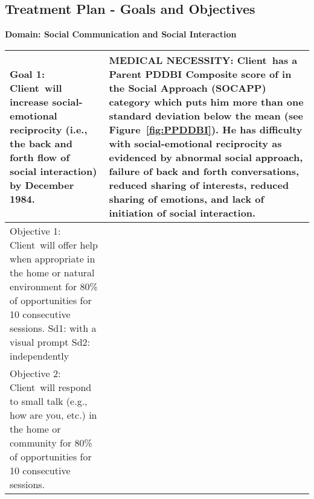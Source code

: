 \documentclass{article}
\def\clientfirstname{Client}
\def\ending{December 1984}
\begin{document}
\begin{landscape}
\section{Treatment Plan - Goals and Objectives}

\textbf{Domain: Social Communication and Social Interaction}\\
	
	\begin{tabular}{|p{11cm}|p{11cm}|}
	\hline
	\textbf{Goal 1:  \clientfirstname\ will increase social-emotional reciprocity (i.e., the back and forth flow of social interaction) by \ending.} & \textbf{MEDICAL NECESSITY:  \clientfirstname\ has a Parent PDDBI Composite score of \getcell{9}{T score} {\parent} in the Social Approach (SOCAPP) category which puts him more than one standard deviation below the mean (see Figure~\ref{fig:PPDDBI}).  He has difficulty with social-emotional reciprocity as evidenced by abnormal social approach, failure of back and forth conversations, reduced sharing of interests, reduced sharing of emotions, and lack of initiation of social interaction.} \\ 
	\hline
	Objective 1: \clientfirstname\ will offer help \underline{\hspace{0.5cm}}when appropriate in the home or natural environment for 80\% of opportunities for 10 consecutive sessions.\newline\newline
	Sd1: with a visual prompt\newline
	Sd2: independently\newline
	& \raisebox{-6.0cm}{\texttt{[image: Help.png]}}\\
	\hline
	
	Objective 2: \clientfirstname\ will respond to small talk (e.g., how are you, etc.) in the home or community for 80\% of opportunities for 10 consecutive sessions. 
	& \\
	\hline
	\end{tabular}\\


\end{landscape}
\end{document}
